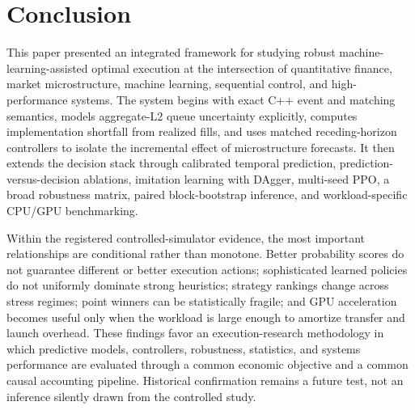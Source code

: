 \documentclass[journal,10pt]{IEEEtran}
\newcommand{\1}{\mathbf{1}}
\begin{document}
\section{Conclusion}
This paper presented an integrated framework for studying robust machine-learning-assisted optimal execution at the intersection of quantitative finance, market microstructure, machine learning, sequential control, and high-performance systems. The system begins with exact C++ event and matching semantics, models aggregate-L2 queue uncertainty explicitly, computes implementation shortfall from realized fills, and uses matched receding-horizon controllers to isolate the incremental effect of microstructure forecasts. It then extends the decision stack through calibrated temporal prediction, prediction-versus-decision ablations, imitation learning with DAgger, multi-seed PPO, a broad robustness matrix, paired block-bootstrap inference, and workload-specific CPU/GPU benchmarking.

Within the registered controlled-simulator evidence, the most important relationships are conditional rather than monotone. Better probability scores do not guarantee different or better execution actions; sophisticated learned policies do not uniformly dominate strong heuristics; strategy rankings change across stress regimes; point winners can be statistically fragile; and GPU acceleration becomes useful only when the workload is large enough to amortize transfer and launch overhead. These findings favor an execution-research methodology in which predictive models, controllers, robustness, statistics, and systems performance are evaluated through a common economic objective and a common causal accounting pipeline. Historical confirmation remains a future test, not an inference silently drawn from the controlled study.

\appendices
\end{document}
